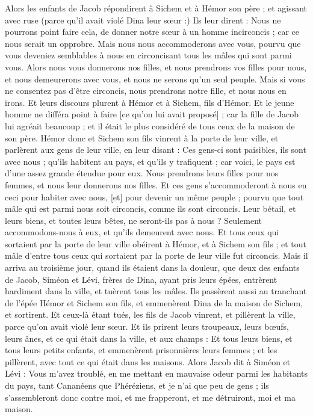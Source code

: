 \begin{multicols}{2}
Alors les enfants de Jacob répondirent à Sichem et à Hémor son père ; et agissant avec ruse (parce qu'il avait violé Dina leur sœur :)
Ils leur dirent : Nous ne pourrons point faire cela, de donner notre sœur à un homme incirconcis ; car ce nous serait un opprobre.
Mais nous nous accommoderons avec vous, pourvu que vous deveniez semblables à nous en circoncisant tous les mâles qui sont parmi vous.
Alors nous vous donnerons nos filles, et nous prendrons vos filles pour nous, et nous demeurerons avec vous, et nous ne serons qu'un seul peuple.
Mais si vous ne consentez pas d'être circoncis, nous prendrons notre fille, et nous nous en irons.
Et leurs discours plurent à Hémor et à Sichem, fils d'Hémor.
Et le jeune homme ne différa point à faire [ce qu'on lui avait proposé] ; car la fille de Jacob lui agréait beaucoup ; et il était le plus considéré de tous ceux de la maison de son père.
Hémor donc et Sichem son fils vinrent à la porte de leur ville, et parlèrent aux gens de leur ville, en leur disant :
Ces gens-ci sont paisibles, ils sont avec nous ; qu'ils habitent au pays, et qu'ils y trafiquent ; car voici, le pays est d'une assez grande étendue pour eux. Nous prendrons leurs filles pour nos femmes, et nous leur donnerons nos filles.
Et ces gens s'accommoderont à nous en ceci pour habiter avec nous, [et] pour devenir un même peuple ; pourvu que tout mâle qui est parmi nous soit circoncis, comme ils sont circoncis.
Leur bétail, et leurs biens, et toutes leurs bêtes, ne seront-ils pas à nous ? Seulement accommodons-nous à eux, et qu'ils demeurent avec nous.
Et tous ceux qui sortaient par la porte de leur ville obéirent à Hémor, et à Sichem son fils ; et tout mâle d'entre tous ceux qui sortaient par la porte de leur ville fut circoncis.
Mais il arriva au troisième jour, quand ils étaient dans la douleur, que deux des enfants de Jacob, Siméon et Lévi, frères de Dina, ayant pris leurs épées, entrèrent hardiment dans la ville, et tuèrent tous les mâles.
Ils passèrent aussi au tranchant de l'épée Hémor et Sichem son fils, et emmenèrent Dina de la maison de Sichem, et sortirent.
Et ceux-là étant tués, les fils de Jacob vinrent, et pillèrent la ville, parce qu'on avait violé leur sœur.
Et ils prirent leurs troupeaux, leurs bœufs, leurs ânes, et ce qui était dans la ville, et aux champs :
Et tous leurs biens, et tous leurs petits enfants, et emmenèrent prisonnières leurs femmes ; et les pillèrent, avec tout ce qui était dans les maisons.
Alors Jacob dit à Siméon et Lévi : Vous m'avez troublé, en me mettant en mauvaise odeur parmi les habitants du pays, tant Cananéens que Phéréziens, et je n'ai que peu de gens ; ils s'assembleront donc contre moi, et me frapperont, et me détruiront, moi et ma maison.

\end{multicols}
